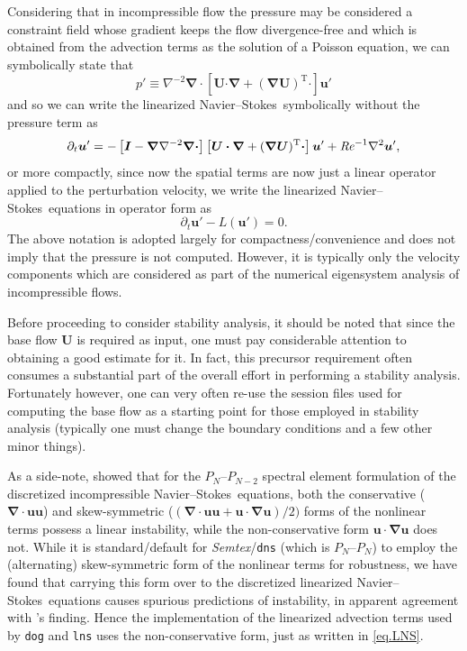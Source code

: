 \documentclass[11pt,a4paper]{report}
\newcommand\Rey{\mbox{\textit{Re}}}
\newcommand\NavSto{Navier--Stokes}
\newcommand\LNS{linearized \NavSto}
\newcommand\Ubase{{\bm{U}}}
\newcommand\upert{{\bm{u}'}}
\newcommand\ppert{{p}'}
\newcommand\Lop{{L}}
\newcommand{\Semtex}{\emph{Semtex}}
\begin{document}
Considering that in incompressible flow the pressure may be considered
a constraint field whose gradient keeps the flow divergence-free and
which is obtained from the advection terms as the solution of a
Poisson equation, we can symbolically state that
\begin{equation}
\ppert\equiv
\nabla^{-2}\bm{\nabla\cdot}\left[\Ubase\bm{\cdot\nabla}
+(\bm{\nabla\Ubase})^\text{T}\bm{\cdot}\right]\upert
\end{equation}
and so we can write the \LNS\ symbolically without the pressure term as
\begin{equation}
\partial_t\upert =
-\left[\bm{I}-\bm{\nabla}\nabla^{-2}\bm{\nabla\cdot}\right]
\left[\Ubase\bm{\cdot\nabla}
  +(\bm{\nabla\Ubase})^\text{T}\bm{\cdot}\right]\upert
+ \Rey^{-1}\nabla^2\upert,
\end{equation}
or more compactly, since now the spatial terms are now just a linear
operator applied to the perturbation velocity, we write the
\LNS\ equations in operator form as
\begin{equation}
\partial_t\upert-\Lop(\upert)=0.		
\label{eq.lns}
\end{equation}
The above notation is adopted largely for compactness/convenience and
does not imply that the pressure is not computed.  However, it is
typically only the velocity components which are considered as part of
the numerical eigensystem analysis of incompressible flows.

Before proceeding to consider stability analysis, it should be noted
that since the base flow $\Ubase$ is required as input, one must pay
considerable attention to obtaining a good estimate for it.  In fact,
this precursor requirement often consumes a substantial part of the
overall effort in performing a stability analysis.  Fortunately
however, one can very often re-use the session files used for
computing the base flow as a starting point for those employed in
stability analysis (typically one must change the boundary conditions
and a few other minor things).

As a side-note, \citet{wikl01} showed that for the $P_N$--$P_{N-2}$
spectral element formulation of the discretized incompressible
\NavSto\ equations, both the conservative ($\bm{\nabla\cdot uu}$) and
skew-symmetric ($(\bm{\nabla\cdot uu}+\bm{u\cdot\nabla u})/2)$ forms
of the nonlinear terms possess a linear instability, while the
non-conservative form $\bm{u\cdot\nabla u}$ does not.  While it is
standard/default for \Semtex/\verb+dns+ (which is $P_N$--$P_N$) to
employ the (alternating) skew-symmetric form of the nonlinear terms
for robustness, we have found that carrying this form over to the
discretized \LNS\ equations causes spurious predictions of
instability, in apparent agreement with \citeauthor{wikl01}'s
finding. Hence the implementation of the linearized advection terms
used by \verb+dog+ and \verb+lns+ uses the non-conservative form, just
as written in \eqref{eq.LNS}.
\end{document}
